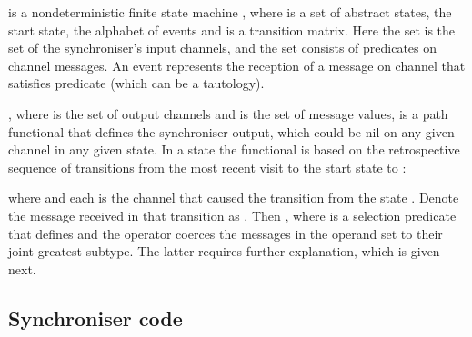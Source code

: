 \documentclass[11pt]{report}
\begin{document}
 is a nondeterministic finite state machine , where  is a set of abstract states,  the start state,  the alphabet of events and  is a transition matrix. Here the set  is the set of the synchroniser's input channels, and the set  consists of predicates on channel messages. An event  represents the reception of a message on channel  that satisfies predicate  (which can be a tautology).

\newcommand\pfun{\mathrel{\ooalign{\hfil\hfil\cr\cr}}}

, where  is the set of output channels and  is the set of message values, is a path functional that defines the synchroniser output, which could be nil on any given channel in any given state. In a state  the functional is based on the retrospective sequence of transitions from the most recent visit to the start state to :


where  and each  is the channel that caused the transition from the state . Denote the message received in that transition
as . Then , where  is a selection predicate that defines  and the operator  coerces the messages in the operand set to their joint greatest subtype.  The latter requires further explanation, which is given next.



\subsection{Synchroniser code\label{sec:sync}}
\end{document}

